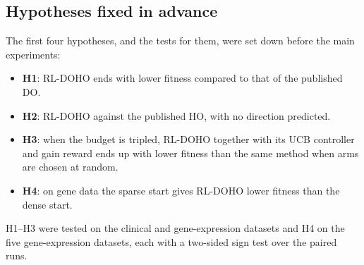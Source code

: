 \documentclass[pdflatex,sn-basic]{sn-jnl}
\begin{document}
\subsection{Hypotheses fixed in advance}
The first four hypotheses, and the tests for them, were set down before the main experiments:
\begin{itemize}
\item \textbf{H1}: RL-DOHO ends with lower fitness compared to that of the published DO.
\item \textbf{H2}: RL-DOHO against the published HO, with no direction predicted.
\item \textbf{H3}: when the budget is tripled, RL-DOHO together with its UCB controller and gain reward ends up with lower fitness than the same method when arms are chosen at random.
\item \textbf{H4}: on gene data the sparse start gives RL-DOHO lower fitness than the dense start.
\end{itemize}
H1--H3 were tested on the clinical and gene-expression datasets and H4 on the five gene-expression datasets, each with a two-sided sign test over the paired runs.
\end{document}

